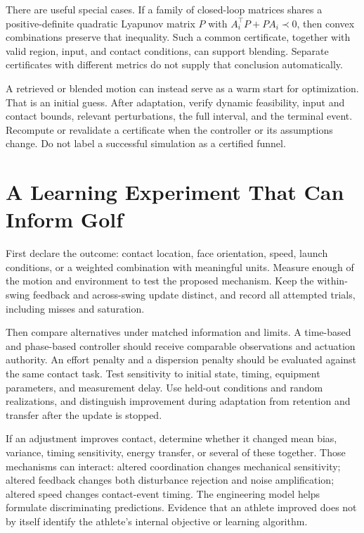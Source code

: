 There are useful special cases. If a family of closed-loop matrices shares a positive-definite quadratic Lyapunov matrix $P$ with $A_i^\top P+PA_i\prec0$, then convex combinations preserve that inequality. Such a common certificate, together with valid region, input, and contact conditions, can support blending. Separate certificates with different metrics do not supply that conclusion automatically.

A retrieved or blended motion can instead serve as a warm start for optimization. That is an initial guess. After adaptation, verify dynamic feasibility, input and contact bounds, relevant perturbations, the full interval, and the terminal event. Recompute or revalidate a certificate when the controller or its assumptions change. Do not label a successful simulation as a certified funnel.

\section{A Learning Experiment That Can Inform Golf}

First declare the outcome: contact location, face orientation, speed, launch conditions, or a weighted combination with meaningful units. Measure enough of the motion and environment to test the proposed mechanism. Keep the within-swing feedback and across-swing update distinct, and record all attempted trials, including misses and saturation.

Then compare alternatives under matched information and limits. A time-based and phase-based controller should receive comparable observations and actuation authority. An effort penalty and a dispersion penalty should be evaluated against the same contact task. Test sensitivity to initial state, timing, equipment parameters, and measurement delay. Use held-out conditions and random realizations, and distinguish improvement during adaptation from retention and transfer after the update is stopped.

If an adjustment improves contact, determine whether it changed mean bias, variance, timing sensitivity, energy transfer, or several of these together. Those mechanisms can interact: altered coordination changes mechanical sensitivity; altered feedback changes both disturbance rejection and noise amplification; altered speed changes contact-event timing. The engineering model helps formulate discriminating predictions. Evidence that an athlete improved does not by itself identify the athlete's internal objective or learning algorithm.

